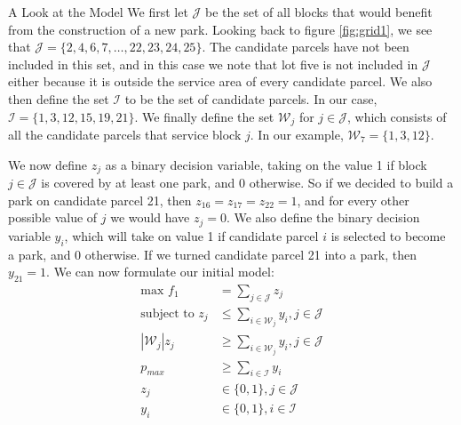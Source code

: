 \documentclass[12pt]{pom_thesis}
\begin{document}
\begin{chapter}{A Look at the Model}
	We first let $\mathcal{J}$ be the set of all blocks that would benefit from the construction of a new park. Looking back to figure \ref{fig:grid1}, we see that $\mathcal{J} = \{ 2,4,6,7, \dots, 22, 23, 24, 25\}$. The candidate parcels have not been included in this set, and in this case we note that lot five is not included in $\mathcal{J}$ either because it is outside the service area of every candidate parcel. We also then define the set $\mathcal{I}$ to be the set of candidate parcels. In our case, $\mathcal{I} = \{ 1,3,12,15,19,21\}$. We finally define the set $\mathcal{W}_j$ for $j \in \mathcal{J}$, which consists of all the candidate parcels that service block $j$. In our example, $\mathcal{W}_7 = \{1,3,12\}$. \newline
	
	We now define $z_j$ as a binary decision variable, taking on the value 1 if block $j \in \mathcal{J}$ is covered by at least one park, and 0 otherwise. So if we decided to build a park on candidate parcel 21, then $z_{16} = z_{17} = z_{22} = 1$, and for every other possible value of $j$ we would have $z_j = 0$. We also define the binary decision variable $y_i$, which will take on value 1 if candidate parcel $i$ is selected to become a park, and 0 otherwise. If we turned candidate parcel 21 into a park, then $y_{21} = 1$. We can now formulate our initial model:
\begin{align*}
\textrm{max } f_1 &= \sum_{j \in \mathcal{J}} z_j \\
\textrm{subject to } z_j &\leq \sum_{i \in \mathcal{W}_j} y_i, j \in \mathcal{J}\\
\left|\mathcal{W}_j\right|z_j &\geq \sum_{i \in \mathcal{W}_j} y_i, j \in \mathcal{J} \\
p_{max} &\geq \sum_{i \in \mathcal{I}} y_i \\
z_j &\in \{0,1\}, j \in \mathcal{J} \\
y_i &\in \{0,1\}, i \in \mathcal{I}
\end{align*}


\end{chapter}
\end{document}
